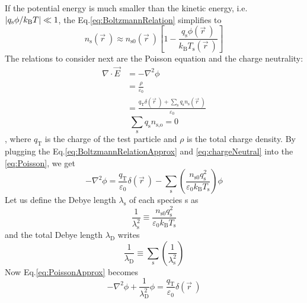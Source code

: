 If the potential energy is much smaller than the kinetic energy, i.e. $\abs{q_\text{s} \phi / k_\text{B} T}\ll 1$, the Eq.\ref{eq:BoltzmannRelation} simplifies to 
\begin{equation}
n_\text{s} \left(\vec{r} ~\right) \approx n_\text{s0} \left( \vec{r} ~\right) \left[ 1- \frac{q_\text{s} \phi \left( \vec{r} ~\right)}{k_\text{B} T_\text{s} \left( \vec{r} ~\right) }\right]
\label{eq:BoltzmannRelationApprox}
\end{equation}
The relations to consider next are the Poisson equation and the charge neutrality:
\begin{equation}
\begin{aligned}
\nabla \cdot \vec{E} &= - \nabla^2 \phi \\
&= \frac{\rho}{\varepsilon_0} \\
&= \frac{q_\text{T} \delta \left( \vec{r} ~\right) +\sum_\text{s} q_\text{s} n_\text{s} \left( \vec{r} ~\right)}{\varepsilon_0}
\end{aligned}
\label{eq:Poisson}
\end{equation}
\begin{equation}
\sum_\text{s} q_\text{s} n_\text{s,o} = 0
\label{eq:chargeNeutral}
\end{equation}
, where $q_\text{T}$ is the charge of the test particle and $\rho$ is the total charge density.
By plugging the Eq.\ref{eq:BoltzmannRelationApprox} and \ref{eq:chargeNeutral} into the \ref{eq:Poisson}, we get
\begin{equation}
- \nabla^2 \phi = \frac{q_\text{T}}{\varepsilon_0} \delta \left( \vec{r} ~\right) - \sum_\text{s} \left( \frac{n_\text{s0} q_\text{s}^2}{\varepsilon_0 k_\text{B} T_\text{s}} \right) \phi
\label{eq:PoissonApprox}
\end{equation}
Let us define the Debye length $\lambda_\text{s}$ of each species s as
\begin{equation}
\frac{1}{\lambda_\text{s}^2} \equiv \frac{n_\text{s0} q_\text{s}^2}{\varepsilon_0 k_\text{B} T_\text{s}}
\end{equation}
and the total Debye length $\lambda_\text{D}$ writes
\begin{equation}
\frac{1}{\lambda_\text{D}} \equiv \sum_\text{s} \left( \frac{1}{\lambda_\text{s}^2} \right)
\end{equation}
Now Eq.\ref{eq:PoissonApprox} becomes
\begin{equation}
- \nabla^2 \phi + \frac{1}{\lambda_\text{D}^2} \phi = \frac{q_\text{T}}{\varepsilon_0} \delta \left( \vec{r} ~\right)
\label{eq:PoissonApproxSimplified}
\end{equation}
